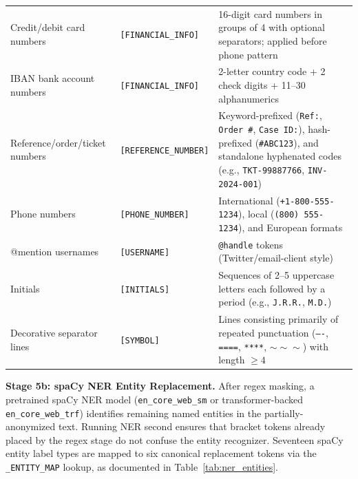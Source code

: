 \documentclass[journal]{IEEEtran}
\begin{document}
\begin{table}[!htbp]
{\begin{tabular}{l l p{4.5cm}}
Credit/debit card numbers & \texttt{[FINANCIAL\_INFO]} & 16-digit card numbers in groups of 4 with optional separators; applied before phone pattern \\
IBAN bank account numbers & \texttt{[FINANCIAL\_INFO]} & 2-letter country code + 2 check digits + 11--30 alphanumerics \\
Reference/order/ticket numbers & \texttt{[REFERENCE\_NUMBER]} & Keyword-prefixed (\texttt{Ref:}, \texttt{Order \#}, \texttt{Case ID:}), hash-prefixed (\texttt{\#ABC123}), and standalone hyphenated codes (e.g., \texttt{TKT-99887766}, \texttt{INV-2024-001}) \\
Phone numbers & \texttt{[PHONE\_NUMBER]} & International (\texttt{+1-800-555-1234}), local (\texttt{(800) 555-1234}), and European formats \\
@mention usernames & \texttt{[USERNAME]} & \texttt{@handle} tokens (Twitter/email-client style) \\
Initials & \texttt{[INITIALS]} & Sequences of 2--5 uppercase letters each followed by a period (e.g., \texttt{J.R.R.}, \texttt{M.D.}) \\
Decorative separator lines & \texttt{[SYMBOL]} & Lines consisting primarily of repeated punctuation (\texttt{----}, \texttt{====}, \texttt{****}, \texttt{$\sim\!\sim\!\sim$}) with length $\ge 4$ \\
\bottomrule
\end{tabular}%
}
\end{table}

\textbf{Stage 5b: spaCy NER Entity Replacement.} After regex masking, a pretrained spaCy NER model (\texttt{en\_core\_web\_sm} or transformer-backed \texttt{en\_core\_web\_trf}) identifies remaining named entities in the partially-anonymized text. Running NER second ensures that bracket tokens already placed by the regex stage do not confuse the entity recognizer. Seventeen spaCy entity label types are mapped to six canonical replacement tokens via the \texttt{\_ENTITY\_MAP} lookup, as documented in Table~\ref{tab:ner_entities}.
\end{document}
